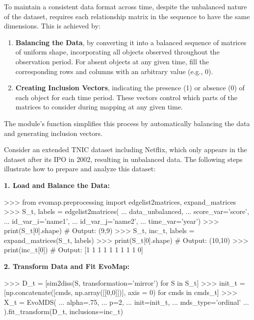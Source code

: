 \documentclass[article]{jss}
\begin{document}
To maintain a consistent data format across time, despite the unbalanced nature of the dataset, 
 requires each relationship matrix in the sequence to have the same dimensions. This is achieved by:

\begin{enumerate}
  \item \textbf{Balancing the Data}, by converting it into a balanced sequence of matrices of uniform %
   shape, incorporating all objects observed throughout the observation period. For absent objects at any given time, %
   fill the corresponding rows and columns with an arbitrary value (e.g., 0).
  \item \textbf{Creating Inclusion Vectors}, indicating the presence (1) %
  or absence (0) of each object for each time period. These vectors control which parts of the matrices to consider during mapping %
  at any given time.
\end{enumerate}

The  module's  function simplifies this process by automatically balancing the data and generating inclusion vectors.

Consider an extended TNIC dataset including Netflix, which only appears in the dataset after its IPO in 2002, 
resulting in unbalanced data. The following steps illustrate how to prepare and analyze this dataset:

\textbf{1. Load and Balance the Data:}

\begin{CodeChunk}
\begin{CodeInput}
>>> from evomap.preprocessing import edgelist2matrices, expand_matrices
>>> S_t, labels = edgelist2matrices(
...     data_unbalanced, 
...     score_var='score', 
...     id_var_i='name1', 
...     id_var_j='name2', 
...     time_var='year')
>>> print(S_t[0].shape)   # Output: (9,9)
>>> S_t, inc_t, labels = expand_matrices(S_t, labels)
>>> print(S_t[0].shape)   # Output: (10,10)
>>> print(inc_t[0])       # Output: [1 1 1 1 1 1 1 1 1 0]
\end{CodeInput}
\end{CodeChunk}

\textbf{2. Transform Data and Fit EvoMap:}

\begin{CodeChunk}
\begin{CodeInput}
>>> D_t = [sim2diss(S, transformation='mirror') for S in S_t]
>>> init_t = [np.concatenate([cmds, np.array([[0,0]])], axis = 0) for cmds in cmds_t]
>>> X_t = EvoMDS(
...     alpha=.75, 
...     p=2,
...     init=init_t, 
...     mds_type='ordinal'
... ).fit_transform(D_t, inclusions=inc_t)    
\end{CodeInput}
\end{CodeChunk}
  
\end{document}
